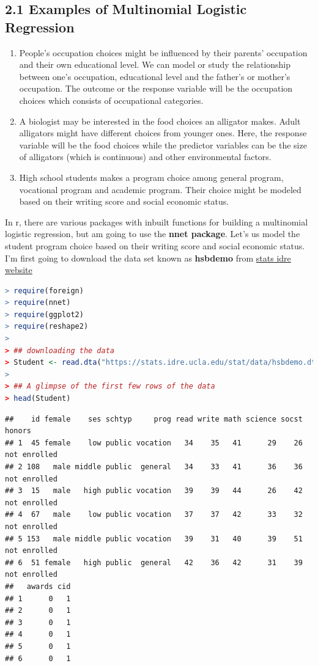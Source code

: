\documentclass[
]{article}
\begin{document}
\hypertarget{examples-of-multinomial-logistic-regression}{%
\subsection{2.1 Examples of Multinomial Logistic
Regression}\label{examples-of-multinomial-logistic-regression}}

\begin{enumerate}
\def\labelenumi{\arabic{enumi}.}
\item
  People's occupation choices might be influenced by their parents'
  occupation and their own educational level. We can model or study the
  relationship between one's occupation, educational level and the
  father's or mother's occupation. The outcome or the response variable
  will be the occupation choices which consists of occupational
  categories.
\item
  A biologist may be interested in the food choices an alligator makes.
  Adult alligators might have different choices from younger ones. Here,
  the response variable will be the food choices while the predictor
  variables can be the size of alligators (which is continuous) and
  other environmental factors.
\item
  High school students makes a program choice among general program,
  vocational program and academic program. Their choice might be modeled
  based on their writing score and social economic status.
\end{enumerate}

In r, there are various packages with inbuilt functions for building a
multinomial logistic regression, but am going to use the \textbf{nnet
package}. Let's us model the student program choice based on their
writing score and social economic status. I'm first going to download
the data set known as \textbf{hsbdemo} from
\href{https://stats.idre.ucla.edu}{stats idre website}

\begin{lstlisting}[language=R]
> require(foreign)
> require(nnet)
> require(ggplot2)
> require(reshape2)
> 
> ## downloading the data
> Student <- read.dta("https://stats.idre.ucla.edu/stat/data/hsbdemo.dta")
> 
> ## A glimpse of the first few rows of the data
> head(Student)
\end{lstlisting}

\begin{lstlisting}
##    id female    ses schtyp     prog read write math science socst       honors
## 1  45 female    low public vocation   34    35   41      29    26 not enrolled
## 2 108   male middle public  general   34    33   41      36    36 not enrolled
## 3  15   male   high public vocation   39    39   44      26    42 not enrolled
## 4  67   male    low public vocation   37    37   42      33    32 not enrolled
## 5 153   male middle public vocation   39    31   40      39    51 not enrolled
## 6  51 female   high public  general   42    36   42      31    39 not enrolled
##   awards cid
## 1      0   1
## 2      0   1
## 3      0   1
## 4      0   1
## 5      0   1
## 6      0   1
\end{lstlisting}
\end{document}
